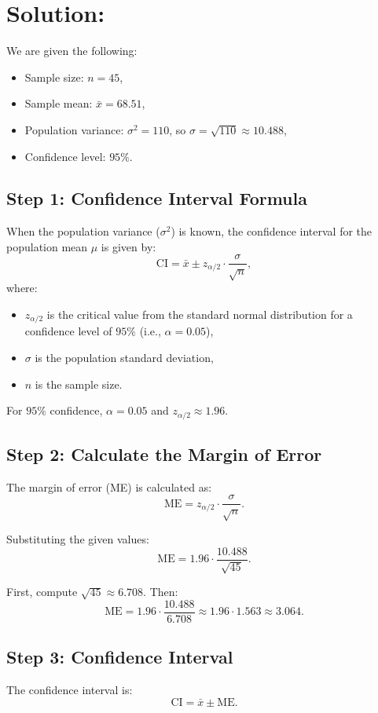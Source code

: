 \documentclass{article}
\begin{document}
\section*{Solution:}

We are given the following:
\begin{itemize}
    \item Sample size: \(n = 45\),
    \item Sample mean: \(\bar{x} = 68.51\),
    \item Population variance: \(\sigma^2 = 110\), so \(\sigma = \sqrt{110} \approx 10.488\),
    \item Confidence level: \(95\%\).
\end{itemize}

\subsection*{Step 1: Confidence Interval Formula}
When the population variance (\(\sigma^2\)) is known, the confidence interval for the population mean \(\mu\) is given by:
\[
\text{CI} = \bar{x} \pm z_{\alpha/2} \cdot \frac{\sigma}{\sqrt{n}},
\]
where:
\begin{itemize}
    \item \(z_{\alpha/2}\) is the critical value from the standard normal distribution for a confidence level of \(95\%\) (i.e., \(\alpha = 0.05\)),
    \item \(\sigma\) is the population standard deviation,
    \item \(n\) is the sample size.
\end{itemize}

For \(95\%\) confidence, \(\alpha = 0.05\) and \(z_{\alpha/2} \approx 1.96\).

\subsection*{Step 2: Calculate the Margin of Error}
The margin of error (ME) is calculated as:
\[
\text{ME} = z_{\alpha/2} \cdot \frac{\sigma}{\sqrt{n}}.
\]

Substituting the given values:
\[
\text{ME} = 1.96 \cdot \frac{10.488}{\sqrt{45}}.
\]

First, compute \(\sqrt{45} \approx 6.708\). Then:
\[
\text{ME} = 1.96 \cdot \frac{10.488}{6.708} \approx 1.96 \cdot 1.563 \approx 3.064.
\]

\subsection*{Step 3: Confidence Interval}
The confidence interval is:
\[
\text{CI} = \bar{x} \pm \text{ME}.
\]
\end{document}
